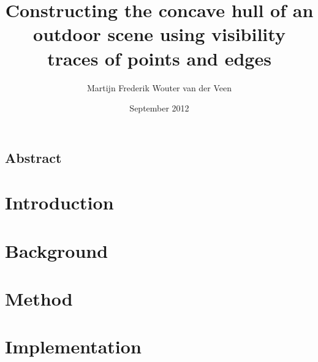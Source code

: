 \documentclass{ucl_thesis}
\title{Constructing the concave hull of an outdoor scene
       using visibility traces of points and edges}
\author{Martijn Frederik Wouter van der Veen}
\date{September 2012}
\begin{document}

\maketitle
{}
\setcounter{page}{1}
\pagestyle{plain}




\newpage
\section*{Abstract}
%



\tableofcontents
\listoffigures
\listofalgorithms
\newpage

%

\setcounter{page}{1}
\pagestyle{plain}




\chapter{Introduction}
\label{introduction}




\chapter{Background}
\label{background}




\chapter{Method} %
\label{method}



\chapter{Implementation}
\label{chp:impl}
%
\end{document}
